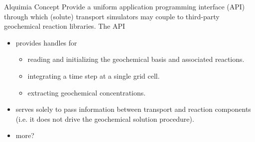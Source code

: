\documentclass{beamer}
\begin{document}
\begin{frame}{Alquimia Concept}
Provide a uniform application programming interface (API) through which (solute) transport simulators may couple to third-party geochemical reaction libraries.  The API
\begin{itemize}
\item provides handles for
\begin{itemize}
\item reading and initializing the geochemical basis and associated reactions.
\item integrating a time step at a single grid cell.
\item extracting geochemical concentrations.
\end{itemize}
\item serves solely to pass information between transport and reaction components (i.e. it does not drive the geochemical solution procedure).
\item more?
\end{itemize}
\end{frame}
\end{document}
